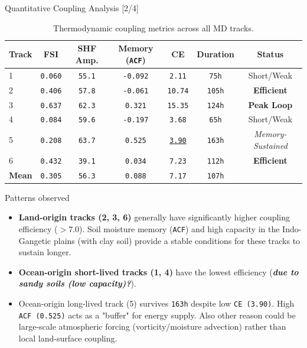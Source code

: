 \documentclass[8pt, aspectratio=169]{beamer}
\begin{document}
\begin{frame}{Quantitative Coupling Analysis [2/4]}
    \vspace{-0.3cm}
    \begin{table}[H]
        \footnotesize
        \centering
        \caption{Thermodynamic coupling metrics across all MD tracks.}
        \begin{tabular}{lcccccc}
            \toprule
            \textbf{Track} & \textbf{FSI} & \textbf{SHF Amp.} & \textbf{Memory (\texttt{ACF})} & \textbf{CE} & \textbf{Duration} & \textbf{Status} \\
            \midrule
            1 & \texttt{0.060} & \texttt{55.1} & \texttt{-0.092} & \texttt{2.11}  & \texttt{75h}  & Short/Weak \\
            2 & \texttt{0.406} & \texttt{57.8} & \texttt{-0.061} & \texttt{10.74} & \texttt{105h} & \textbf{Efficient} \\
            3 & \texttt{0.637} & \texttt{62.3} & \texttt{0.321}  & \texttt{15.35} & \texttt{124h} & \textbf{Peak Loop} \\
            4 & \texttt{0.084} & \texttt{59.6} & \texttt{-0.197} & \texttt{3.68}  & \texttt{65h}  & Short/Weak \\
            5 & \texttt{0.208} & \texttt{63.7} & \texttt{0.525}  & \underline{\texttt{3.90}}  & \texttt{163h} & \textit{Memory-Sustained} \\
            6 & \texttt{0.432} & \texttt{39.1} & \texttt{0.034}  & \texttt{7.23}  & \texttt{112h} & \textbf{Efficient} \\
            \midrule
            \textbf{Mean} & \texttt{0.305} & \texttt{56.3} & \texttt{0.088} & \texttt{7.17} & \texttt{107h} & \\
            \bottomrule
        \end{tabular}
    \end{table}

    \footnotesize
    \begin{block}{Patterns observed}
        \begin{itemize}
            \item \textbf{Land-origin tracks (2, 3, 6)} generally have significantly higher coupling efficiency ($>7.0$). Soil moisture memory (\texttt{ACF}) and high capacity in the Indo-Gangetic plains (with clay soil) provide a stable conditions for these tracks to sustain longer.
            \item \textbf{Ocean-origin short-lived tracks (1, 4)} have the lowest efficiency (\textbf{\textit{due to sandy soils (low capacity)?}}).
            \item Ocean-origin long-lived track (5) survives \texttt{163h} despite low \texttt{CE (3.90)}. High \texttt{ACF (0.525)} acts as a "buffer" for energy supply. Also other reason could be large-scale atmospheric forcing (vorticity/moisture advection) rather than local land-surface coupling.
        \end{itemize}
    \end{block}
\end{frame}
\end{document}
